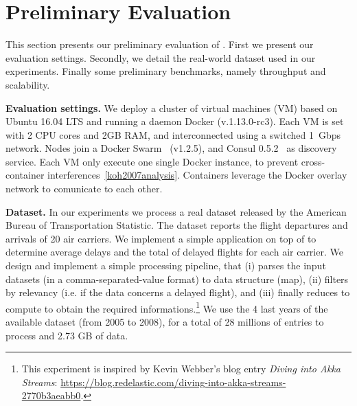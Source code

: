 \section{Preliminary Evaluation}
\label{sec:eval}

This section presents our preliminary evaluation of \SYS.
First we present our evaluation settings.
Secondly, we detail the real-world dataset used in our experiments. 
Finally some preliminary benchmarks, namely throughput and scalability.

\textbf{Evaluation settings.} We deploy a cluster of virtual machines (VM) based on Ubuntu 16.04 LTS and running a daemon Docker (v.1.13.0-rc3).
Each VM is set with 2 CPU cores and 2GB RAM, and interconnected using a switched 1~Gbps network.
Nodes join a Docker Swarm~\cite{docker:swarm_2016} (v1.2.5), and Consul 0.5.2~\cite{consul} as discovery service.
Each VM only execute one single Docker instance, to prevent cross-container interferences~\ref{koh2007analysis}. 
Containers leverage the Docker overlay network to comunicate to each other.

\textbf{Dataset.} In our experiments we process a real dataset released by the American Bureau of Transportation Statistic\cite{rita:bts}.
The dataset reports the flight departures and arrivals of 20 air carriers\cite{statistical_computing:data}.%
We implement a simple application on top of \SYS to determine average delays and the total of delayed flights for each air carrier.
We design and implement a simple processing pipeline, that (i) parses the input datasets (in a comma-separated-value format) to data structure (map), (ii) filters by relevancy (i.e. if the data concerns a delayed flight), and (iii) finally reduces to compute to obtain the required informations.\footnote{This experiment is inspired by Kevin Webber's blog entry \emph{Diving into Akka Streams}: \url{https://blog.redelastic.com/diving-into-akka-streams-2770b3aeabb0}.}
We use the 4 last years of the available dataset (from 2005 to 2008), for a total of 28 millions of entries to process and 2.73 GB of data.

